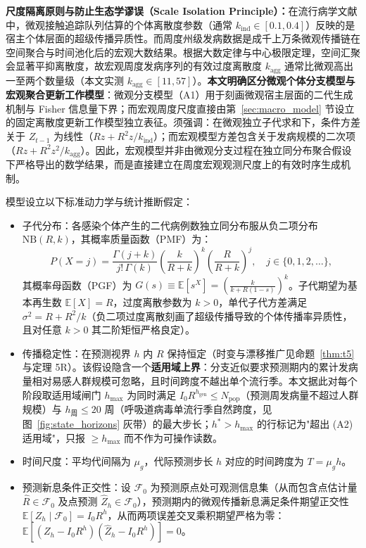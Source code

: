 \documentclass[10pt,a4paper]{article}
\theoremstyle{plain}
\theoremstyle{definition}
\begin{document}
\noindent\textbf{尺度隔离原则与防止生态学谬误（Scale Isolation Principle）：}在流行病学文献中，微观接触追踪队列估算的个体离散度参数（通常 $k_{\text{ind}} \in [0.1, 0.4]$）反映的是宿主个体层面的超级传播异质性\citep{lloyd-smith2005superspreading}。而周度州级发病数据是成千上万条微观传播链在空间聚合与时间池化后的宏观大数结果。根据大数定律与中心极限定理，空间汇聚会显著平抑离散度，故宏观周度发病序列的有效过度离散度 $k_{\text{agg}}$ 通常比微观高出一至两个数量级（本文实测 $k_{\text{agg}} \in [11, 57]$）。\textbf{本文明确区分微观个体分支模型与宏观聚合更新工作模型}：微观分支模型（A1）用于刻画微观宿主层面的二代生成机制与 Fisher 信息量下界；而宏观周度尺度直接由第~\ref{sec:macro_model} 节设立的固定离散度更新工作模型独立表征。须强调：在微观独立子代求和下，条件方差关于 $Z_{t-1}$ 为线性（$Rz + R^2 z / k_{\text{ind}}$）；而宏观模型方差包含关于发病规模的二次项（$Rz + R^2 z^2 / k_{\text{agg}}$）。因此，宏观模型并非由微观分支过程在独立同分布聚合假设下严格导出的数学结果，而是直接建立在周度宏观观测尺度上的有效时序生成机制。

模型设立以下标准动力学与统计推断假定：
\begin{itemize}
\item[(A1)] 子代分布：各感染个体产生的二代病例数独立同分布服从负二项分布 $\text{NB}(R, k)$，其概率质量函数（PMF）为：
\begin{equation}
P(X = j) = \frac{\Gamma(j+k)}{j!\,\Gamma(k)} \left(\frac{k}{R+k}\right)^k \left(\frac{R}{R+k}\right)^j, \quad j \in \{0, 1, 2, \dots\},
\label{eq:nb_pmf}
\end{equation}
其概率母函数（PGF）为 $G(s) \equiv \mathbb{E}[s^X] = \left(\frac{k}{k + R(1-s)}\right)^k$。子代期望为基本再生数 $\mathbb{E}[X] = R$，过度离散参数为 $k > 0$，单代子代方差满足 $\sigma^2 = R + R^2/k$（负二项过度离散刻画了超级传播导致的个体传播率异质性\citep{lloyd-smith2005superspreading, king2015avoidable}，且对任意 $k > 0$ 其二阶矩恒严格良定）。
\item[(A2)] 传播稳定性：在预测视界 $h$ 内 $R$ 保持恒定（时变与漂移推广见命题~\ref{thm:t5} 与定理 5R）。该假设隐含一个\textbf{适用域上界}：分支近似要求预测期内的累计发病量相对易感人群规模可忽略，且时间跨度不越出单个流行季。本文据此对每个阶段取适用域闸门 $h_{\max}$ 为同时满足 $I_0 R^{h_{\text{gen}}} \le N_{\text{pop}}$（预测周发病量不超过人群规模）与 $h_{\text{周}} \le 20$ 周（呼吸道病毒单流行季自然跨度，见图~\ref{fig:state_horizons} 灰带）的最大步长；$h^* > h_{\max}$ 的行标记为"超出 (A2) 适用域"，只报 $\ge h_{\max}$ 而不作为可操作读数。
\item[(A3)] 时间尺度：平均代间隔为 $\mu_g$，代际预测步长 $h$ 对应的时间跨度为 $T = \mu_g h$。
\item[(A4)] 预测新息条件正交性：设 $\mathcal{F}_0$ 为预测原点处可观测信息集（从而包含点估计量 $\hat{R} \in \mathcal{F}_0$ 及点预测 $\hat{Z}_h \in \mathcal{F}_0$），预测期内的微观传播新息满足条件期望正交性 $\mathbb{E}[Z_h \mid \mathcal{F}_0] = I_0 R^h$，从而两项误差交叉乘积期望严格为零：$\mathbb{E}[(Z_h - I_0 R^h)(\hat{Z}_h - I_0 R^h)] = 0$。
\end{itemize}
\end{document}

